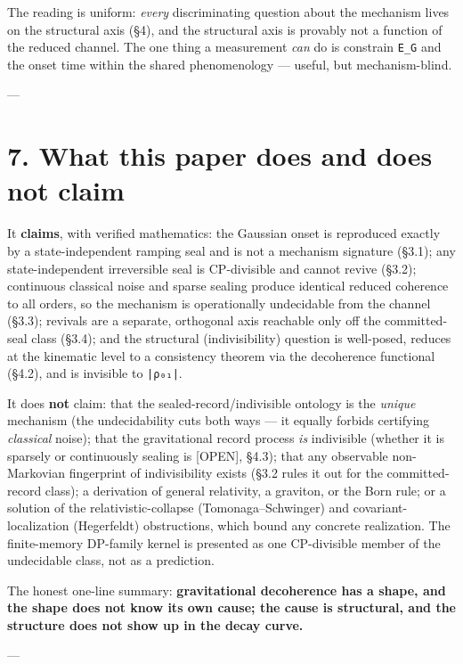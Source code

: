 \documentclass[11pt]{article}
\begin{document}
The reading is uniform: \emph{every} discriminating question about the mechanism lives on the structural axis (§4), and the structural axis is provably not a function of the reduced channel. The one thing a measurement \emph{can} do is constrain \texttt{E\_G} and the onset time within the shared phenomenology — useful, but mechanism-blind.

---

\section*{7. What this paper does and does not claim}
It \textbf{claims}, with verified mathematics: the Gaussian onset is reproduced exactly by a state-independent ramping seal and is not a mechanism signature (§3.1); any state-independent irreversible seal is CP-divisible and cannot revive (§3.2); continuous classical noise and sparse sealing produce identical reduced coherence to all orders, so the mechanism is operationally undecidable from the channel (§3.3); revivals are a separate, orthogonal axis reachable only off the committed-seal class (§3.4); and the structural (indivisibility) question is well-posed, reduces at the kinematic level to a consistency theorem via the decoherence functional (§4.2), and is invisible to \texttt{|ρ₀₁|}.

It does \textbf{not} claim: that the sealed-record/indivisible ontology is the \emph{unique} mechanism (the undecidability cuts both ways — it equally forbids certifying \emph{classical} noise); that the gravitational record process \emph{is} indivisible (whether it is sparsely or continuously sealing is [OPEN], §4.3); that any observable non-Markovian fingerprint of indivisibility exists (§3.2 rules it out for the committed-record class); a derivation of general relativity, a graviton, or the Born rule; or a solution of the relativistic-collapse (Tomonaga–Schwinger) and covariant-localization (Hegerfeldt) obstructions, which bound any concrete realization. The finite-memory DP-family kernel is presented as one CP-divisible member of the undecidable class, not as a prediction.

The honest one-line summary: \textbf{gravitational decoherence has a shape, and the shape does not know its own cause; the cause is structural, and the structure does not show up in the decay curve.}

---
\end{document}
